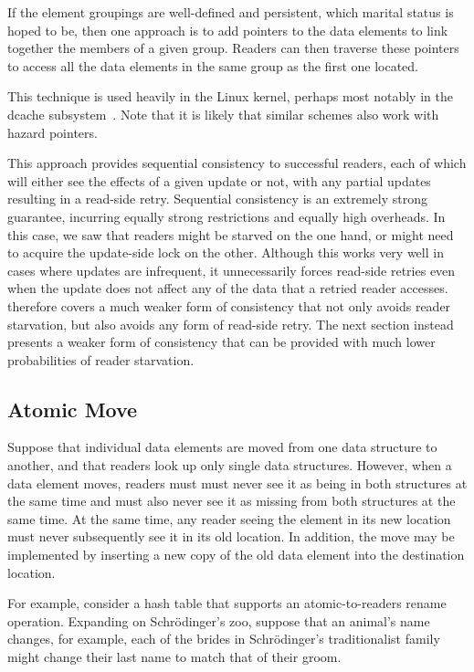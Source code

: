If the element groupings are well-defined and persistent, which marital
status is hoped to be,
then one approach is to add pointers to the data elements to link
together the members of a given group.
Readers can then traverse these pointers to access all the data elements
in the same group as the first one located.

This technique is used heavily in the Linux kernel, perhaps most
notably in the dcache subsystem~\cite{NeilBrown2015RCUwalk}.
Note that it is likely that similar schemes also work with hazard
pointers.

This approach provides sequential consistency to successful readers,
each of which will either see the effects of a given update or not,
with any partial updates resulting in a read-side retry.
Sequential consistency is an extremely strong guarantee, incurring equally
strong restrictions and equally high overheads.
In this case, we saw that readers might be starved on the one hand, or
might need to acquire the update-side lock on the other.
Although this works very well in cases where updates are infrequent,
it unnecessarily forces read-side retries even when the update does not
affect any of the data that a retried reader accesses.
 therefore covers a much weaker form
of consistency that not only avoids reader starvation, but also avoids
any form of read-side retry.
The next section instead presents a weaker form of consistency that
can be provided with much lower probabilities of reader starvation.

\subsection{Atomic Move}
\label{sec:together:Atomic Move}

Suppose that individual data elements are moved from one data structure
to another, and that readers look up only single data structures.
However, when a data element moves, readers must must never see it as
being in both structures at the same time and must also never see it as
missing from both structures at the same time.
At the same time, any reader seeing the element in its new location
must never subsequently see it in its old location.
In addition, the move may be implemented by inserting a new copy of the
old data element into the destination location.

For example, consider a hash table that supports an atomic-to-readers
rename operation.
Expanding on Schr\"odinger's zoo, suppose that an animal's name changes,
for example, each of the brides in Schr\"odinger's traditionalist family
might change their last name to match that of their groom.

